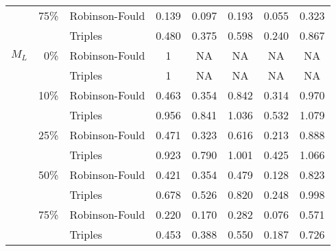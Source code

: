 \begin{tabular}{rrlccccc}
              & 75\%         & Robinson-Fould & 0.139 & 0.097  & 0.193 & 0.055  & 0.323 \\ %
              &              & Triples        & 0.480 & 0.375  & 0.598 & 0.240  & 0.867 \\ %
    $M_L$     & 0\%          & Robinson-Fould & 1 & NA  & NA & NA  & NA \\
              &              & Triples        & 1 & NA  & NA & NA  & NA \\
              & 10\%         & Robinson-Fould & 0.463 & 0.354  & 0.842 & 0.314  & 0.970 \\ %
              &              & Triples        & 0.956 & 0.841  & 1.036 & 0.532  & 1.079 \\ %
              & 25\%         & Robinson-Fould & 0.471 & 0.323  & 0.616 & 0.213  & 0.888 \\ %
              &              & Triples        & 0.923 & 0.790  & 1.001 & 0.425  & 1.066 \\ %
              & 50\%         & Robinson-Fould & 0.421 & 0.354  & 0.479 & 0.128  & 0.823 \\ %
              &              & Triples        & 0.678 & 0.526  & 0.820 & 0.248  & 0.998 \\ %
              & 75\%         & Robinson-Fould & 0.220 & 0.170  & 0.282 & 0.076  & 0.571 \\ %
              &              & Triples        & 0.453 & 0.388  & 0.550 & 0.187  & 0.726 \\ %
    \hline
\end{tabular}